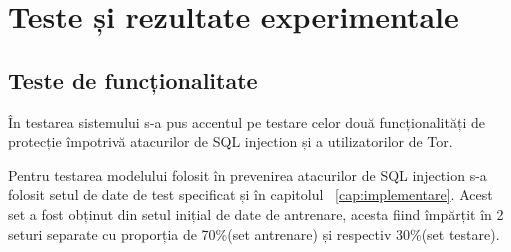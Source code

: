 
 \chapter{Teste și rezultate experimentale}
\label{cap:rezultate}

%
%
%

 \section{Teste de funcționalitate}
 
În testarea sistemului s-a pus accentul pe testare celor două funcționalități de protecție împotrivă atacurilor de SQL injection și a utilizatorilor de Tor. 

Pentru testarea modelului folosit în prevenirea atacurilor de SQL injection s-a folosit setul de date de test specificat și în capitolul ~\ref{cap:implementare}. Acest set a fost obținut din setul inițial de date de antrenare, acesta fiind împărțit în 2 seturi separate cu proporția de 70\%(set antrenare) și respectiv 30\%(set testare). 
 
